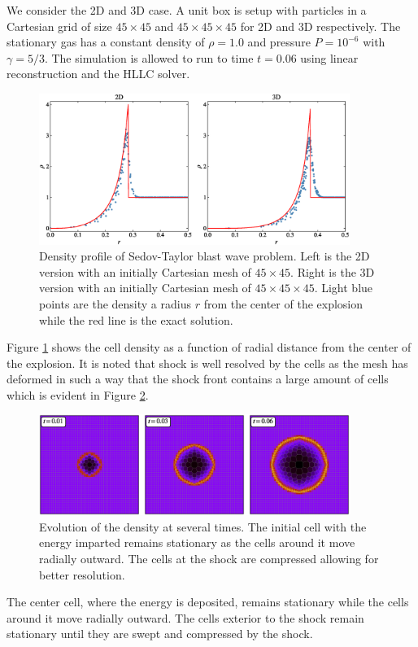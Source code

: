 We consider the 2D and 3D case. A unit box is setup with particles in a Cartesian grid of size
$45\times 45$ and $45 \times 45 \times 45$ for 2D and 3D respectively. The stationary gas has
a constant density of $\rho = 1.0$ and pressure $P = 10^{-6}$ with $\gamma=5/3$. The simulation is
allowed to run to time $t=0.06$ using linear reconstruction and the HLLC solver.
\begin{figure}
    \begin{center}
        \includegraphics[width=0.9\textwidth]{figures/sedov_compare.eps}
        \caption{Density profile of Sedov-Taylor blast wave problem. Left is the 2D version with an initially
        Cartesian mesh of $45 \times 45$. Right is the 3D version with an initially Cartesian mesh of 
        $45 \times 45 \times 45$. Light blue points are the density a radius $r$ from the center of the explosion
        while the red line is the exact solution.}
        \label{fig.sedov}
    \end{center}
\end{figure}
Figure \ref{fig.sedov} shows the cell density as a function of radial distance from the center of the
explosion. It is noted that shock is well resolved by the cells as the mesh has deformed in such a way
that the shock front contains a large amount of cells which is evident in
Figure \ref{fig.sedov_panel}.
\begin{figure}
    \begin{center}
        \includegraphics[width=0.9\textwidth]{figures/sedov_panel.eps}
        \caption{Evolution of the density at several times. The initial cell with the energy
        imparted remains stationary as the cells around it move radially outward. The cells at
        the shock are compressed allowing for better resolution.}
        \label{fig.sedov_panel}
    \end{center}
\end{figure}
The center cell, where the energy is deposited, remains stationary while the
cells around it move radially outward. The cells exterior to the shock remain
stationary until they are swept and compressed by the shock.

